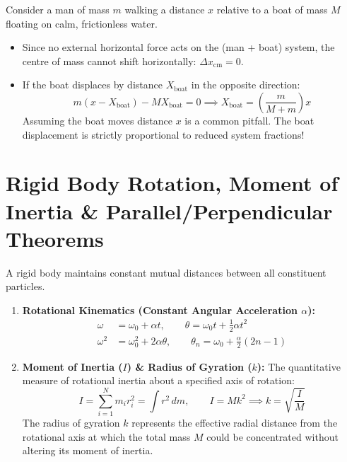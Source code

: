 \documentclass[10pt,twoside,openright]{book}
\begin{document}
\begin{trapbox}
Consider a man of mass $m$ walking a distance $x$ relative to a boat of mass $M$ floating on calm, frictionless water.
\begin{itemize}
  \item Since no external horizontal force acts on the (man + boat) system, the centre of mass cannot shift horizontally: $\Delta x_{\text{cm}} = 0$.
  \item If the boat displaces by distance $X_{\text{boat}}$ in the opposite direction:
  \begin{equation}
    m(x - X_{\text{boat}}) - M X_{\text{boat}} = 0 \implies X_{\text{boat}} = \left(\frac{m}{M + m}\right)x
  \end{equation}
  Assuming the boat moves distance $x$ is a common pitfall. The boat displacement is strictly proportional to reduced system fractions!
\end{itemize}
\end{trapbox}

\section{Rigid Body Rotation, Moment of Inertia \& Parallel/Perpendicular Theorems}

\begin{conceptbox}
A rigid body maintains constant mutual distances between all constituent particles.
\begin{enumerate}[leftmargin=*]
  \item \textbf{Rotational Kinematics (Constant Angular Acceleration $\alpha$):}
  \begin{align}
    \omega &= \omega_0 + \alpha t, \qquad \theta = \omega_0 t + \frac{1}{2}\alpha t^2 \\
    \omega^2 &= \omega_0^2 + 2\alpha\theta, \qquad \theta_n = \omega_0 + \frac{\alpha}{2}(2n - 1)
  \end{align}
  \item \textbf{Moment of Inertia ($I$) \& Radius of Gyration ($k$):} The quantitative measure of rotational inertia about a specified axis of rotation:
  \begin{equation}
    I = \sum_{i=1}^N m_i r_i^2 = \int r^2\,dm, \qquad I = M k^2 \implies k = \sqrt{\frac{I}{M}}
  \end{equation}
  The radius of gyration $k$ represents the effective radial distance from the rotational axis at which the total mass $M$ could be concentrated without altering its moment of inertia.
\end{enumerate}
\end{conceptbox}
\end{document}
